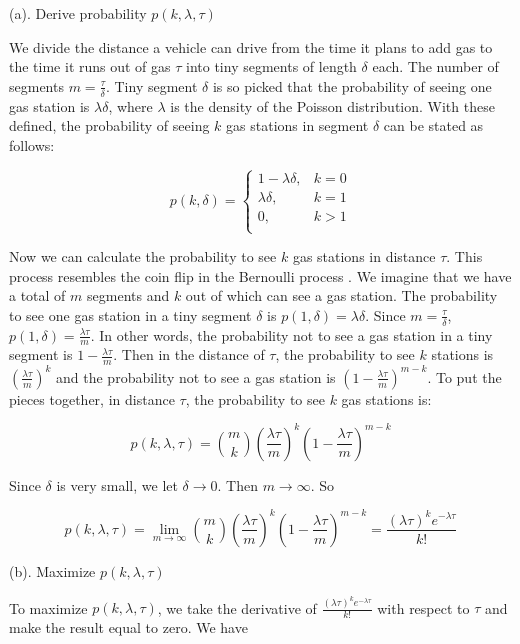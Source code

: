 \documentclass[conference]{IEEEtran}
\theoremstyle{definition}
\begin{document}
\noindent (a). Derive probability $p(k, \lambda, \tau)$

 We divide the distance a vehicle can drive from the time it plans to add gas to the time it runs out of gas $\tau$ into tiny segments of length $\delta$ each. The number of segments $m=\frac{\tau}{\delta}$. Tiny segment $\delta$ is so picked that the probability of seeing one gas station is $\lambda \delta$, where $\lambda$ is the density of the Poisson distribution. With these defined, the probability of seeing $k$ gas stations in segment $\delta$ can be stated as follows:

\[
p(k, \delta) =
\begin{cases}
1-\lambda \delta, & \text{$k = 0$}\\
\lambda \delta, &\text{$k = 1$}\\
0, &\text{$k > 1$}\\
\end{cases}
\]



Now we can calculate the probability to see $k$ gas stations in distance $\tau$. This process resembles the coin flip in the Bernoulli process \cite{Bernoulli}. We imagine that we have a total of $m$ segments and $k$ out of which can see a gas station. The probability to see one gas station in a tiny segment $\delta$ is $p(1,\delta)=\lambda \delta$. Since $m = \frac{\tau}{\delta}$, $p(1, \delta)= \frac{\lambda \tau}{m}$. In other words, the probability not to see a gas station in a tiny segment is $1-\frac{\lambda \tau}{m}$. Then in the distance of $\tau$, the probability to see $k$ stations is $(\frac{\lambda \tau}{m})^{k}$ and the probability not to see a gas station is $(1-\frac{\lambda \tau}{m})^{m-k}$. To put the pieces together, in  distance $\tau$, the probability to see $k$ gas stations is:

\[p(k, \lambda, \tau) = \binom{m}{k}  (\frac{\lambda \tau}{m})^{k}(1-\frac{\lambda \tau}{m})^{m-k} \]

Since $\delta$ is very small, we let $\delta \rightarrow 0$. Then $m \rightarrow \infty$. So

\begin{equation} \label{ppdf}
p(k, \lambda, \tau) =\lim_{m \rightarrow \infty} \binom{m}{k}  (\frac{\lambda \tau}{m})^{k}(1-\frac{\lambda \tau}{m})^{m-k} = \frac{(\lambda \tau)^{k} e^{-\lambda \tau}}{k!}
\end{equation}

\noindent (b). Maximize $p(k, \lambda, \tau)$

To maximize $p(k, \lambda, \tau)$, we take the derivative of $\frac{(\lambda \tau)^{k} e^{-\lambda \tau}}{k!}$ with respect to $\tau$ and make the result equal to zero. We have
\end{document}
